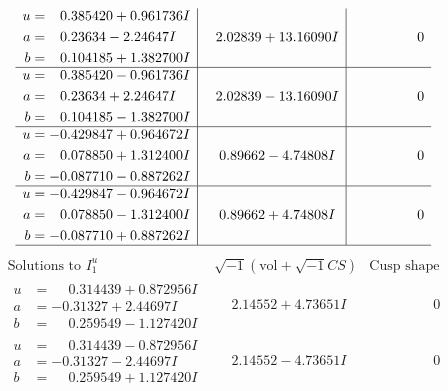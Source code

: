 \documentclass[1p]{elsarticle_modified}
\theoremstyle{definition}
\newcommand{\I}{\sqrt{-1}}
\begin{document}
$$\begin{array}{c|c|c}
\begin{aligned}
u &= \phantom{-}0.385420 + 0.961736 I \\
a &= \phantom{-}0.23634 - 2.24647 I \\
b &= \phantom{-}0.104185 + 1.382700 I\end{aligned}
 & \phantom{-}2.02839 + 13.16090 I & \phantom{-0.000000 } 0 \\ \hline\begin{aligned}
u &= \phantom{-}0.385420 - 0.961736 I \\
a &= \phantom{-}0.23634 + 2.24647 I \\
b &= \phantom{-}0.104185 - 1.382700 I\end{aligned}
 & \phantom{-}2.02839 - 13.16090 I & \phantom{-0.000000 } 0 \\ \hline\begin{aligned}
u &= -0.429847 + 0.964672 I \\
a &= \phantom{-}0.078850 + 1.312400 I \\
b &= -0.087710 - 0.887262 I\end{aligned}
 & \phantom{-}0.89662 - 4.74808 I & \phantom{-0.000000 } 0 \\ \hline\begin{aligned}
u &= -0.429847 - 0.964672 I \\
a &= \phantom{-}0.078850 - 1.312400 I \\
b &= -0.087710 + 0.887262 I\end{aligned}
 & \phantom{-}0.89662 + 4.74808 I & \phantom{-0.000000 } 0\\
 \hline 
 \end{array}$$\newpage$$\begin{array}{c|c|c}  
\text{Solutions to }I^u_{1}& \I (\text{vol} + \sqrt{-1}CS) & \text{Cusp shape}\\
 \hline 
\begin{aligned}
u &= \phantom{-}0.314439 + 0.872956 I \\
a &= -0.31327 + 2.44697 I \\
b &= \phantom{-}0.259549 - 1.127420 I\end{aligned}
 & \phantom{-}2.14552 + 4.73651 I & \phantom{-0.000000 } 0 \\ \hline\begin{aligned}
u &= \phantom{-}0.314439 - 0.872956 I \\
a &= -0.31327 - 2.44697 I \\
b &= \phantom{-}0.259549 + 1.127420 I\end{aligned}
 & \phantom{-}2.14552 - 4.73651 I & \phantom{-0.000000 } 0 \\ \hline\begin{aligned}

\end{aligned}
\end{array}$$
\end{document}
